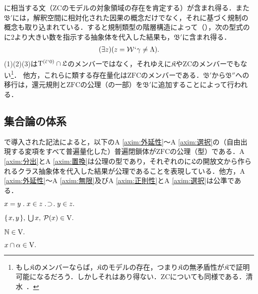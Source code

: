 に相当する文（$\mathrm{ZC}$のモデルの対象領域の存在を肯定する）が含まれ得る．また$\mathfrak{B}'$には，解釈空間に相対化された因果の概念だけでなく，それに基づく規制の概念も取り込まれている．すると規制類型の階層構造によって（），次の型式の\kagi{$ \gamma $}に$2$より大きい数を指示する抽象体を代入した結果も，$\mathfrak{B}'$に含まれ得る．
\begin{align}
    (\exists z)(z = \mathcal{W}{\mspace{1mu}{`}\mspace{1mu}} \gamma\neq\Lambda).
\end{align}
(1)(2)(3)は$\mathrm{T}^{(\breve{\epsilon}{\mspace{1mu}{`}\mspace{1mu}} 0)}\cap\mathfrak{L}$のメンバーではなく，それゆえに$\mathfrak{K}$や$\mathrm{ZC}$のメンバーでもない\footnote{
    もし$\mathfrak{K}$のメンバーならば，$\mathfrak{K}$のモデルの存在，つまり$\mathfrak{K}$の無矛盾性が$\mathfrak{K}$で証明可能になるだろう．しかしそれはあり得ない．$\mathrm{ZC}$についても同様である．清水~\cite[p.\,131,169]{清水}．
}．
他方，これらに類する存在量化は$\mathrm{ZFC}$のメンバーである．$\mathfrak{B}'$から$\mathfrak{B}''$への移行は，還元規則と$\mathrm{ZFC}$の公理（の一部）を$\mathfrak{B}'$に追加することによって行われる．

\subsection{集合論の体系}
\label{ssec:集合論の体系}

で導入された記法によると，以下のA \ref{axim:外延性}〜A \ref{axim:選択}の（自由出現する変項をすべて普遍量化した）普遍閉鎖体が$\mathrm{ZFC}$の公理（型）である．A \ref{axim:分出}とA \ref{axim:置換}は公理の型であり，それぞれの\kagi{$ \alpha $}に$\mathfrak{L}$の開放文から作られるクラス抽象体を代入した結果が公理であることを表現している．他方，A \ref{axim:外延性}〜A \ref{axim:無限}及びA \ref{axim:正則性}とA \ref{axim:選択}は公準である．

\begin{axim}[外延性]
\label{axim:外延性}
$
    x=y\con{1}x\in z\case{1}{1}{1}y\in z.
$
\end{axim}

\begin{axim}[一対化，和，冪]
\label{axim:一対化，和，冪}
$
    \{\mspace{2mu}x,y\mspace{2mu}\},\:{\textstyle\bigcup}\mspace{3mu}x,\:\mathcal{P}(x)\in\mathrm{V}.
$
\end{axim}

\begin{axim}[無限]
\label{axim:無限}
$
    \mathbb{N}\in\mathrm{V}.
$
\end{axim}

\begin{axim}[分出]
\label{axim:分出}
$
    x\cap\alpha\in\mathrm{V}.
$
\end{axim}

